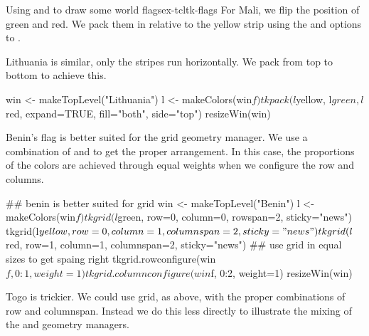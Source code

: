 \begin{example}{Using  and  to draw some world flags}{ex-tcltk-flags}
For Mali, we flip the position of green and red. We pack them in relative to the yellow strip using the  and  options to .
\begin{Schunk}
\end{Schunk}

Lithuania is similar, only the stripes run horizontally. We pack from top to bottom to achieve this.
\begin{Schunk}
\begin{Sinput}
 win <- makeTopLevel("Lithuania")
 l <- makeColors(win$f)
 tkpack(l$yellow, l$green, l$red, expand=TRUE, fill="both", side="top")
 resizeWin(win)
\end{Sinput}
\end{Schunk}

Benin's flag is better suited for the grid geometry manager. We use a combination of  and  to get the proper arrangement. In this case, the proportions of the colors are achieved through equal weights when we configure the row and columns.
\begin{Schunk}
\begin{Sinput}
 ## benin is better suited for grid
 win <- makeTopLevel("Benin")
 l <- makeColors(win$f)
 tkgrid(l$green,  row=0, column=0, rowspan=2,    sticky="news")
 tkgrid(l$yellow, row=0, column=1, columnspan=2, sticky="news")
 tkgrid(l$red,    row=1, column=1, columnspan=2, sticky="news")
 ## use grid in equal sizes to get spaing right
 tkgrid.rowconfigure(win$f, 0:1, weight=1)
 tkgrid.columnconfigure(win$f, 0:2, weight=1) 
 resizeWin(win)
\end{Sinput}
\end{Schunk}

Togo is trickier. We could use grid,  as above, with the proper
combinations of row and columnspan. Instead we do this less directly to illustrate the mixing of the  and  geometry managers.


\end{example}
